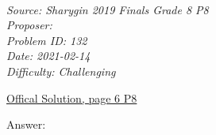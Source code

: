 \SSbreak\\
\emph{Source: Sharygin 2019 Finals Grade 8 P8}\\
\emph{Proposer: \Pnjoy}\\
\emph{Problem ID: 132}\\
\emph{Date: 2021-02-14}\\
\emph{Difficulty: Challenging}\\
\SSbreak

\bigskip

\begin{solution}\hfil\medskip
  \href{https://geometry.ru/olimp/2019/final_sol_eng.pdf}{Offical Solution, page 6 P8}

  Answer: 
\end{solution}\bigskip
